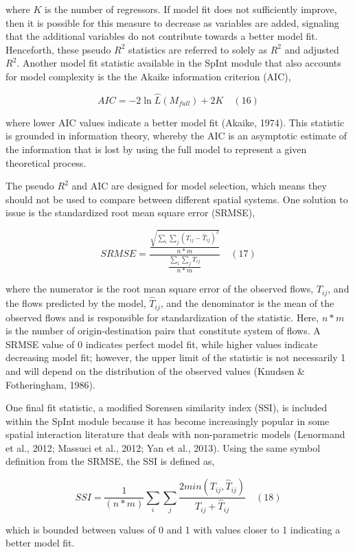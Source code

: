 \documentclass[11pt]{article}
\begin{document}
where \(K\) is the number of regressors. If model fit does not
sufficiently improve, then it is possible for this measure to decrease
as variables are added, signaling that the additional variables do not
contribute towards a better model fit. Henceforth, these pseudo \(R^2\)
statistics are referred to solely as \(R^2\) and adjusted \(R^2\).
Another model fit statistic available in the SpInt module that also
accounts for model complexity is the the Akaike information criterion
(AIC),

\[ AIC = -2\ln \hat{L}(M_{full}) + 2K  \quad(16)\]

where lower AIC values indicate a better model fit (Akaike, 1974). This
statistic is grounded in information theory, whereby the AIC is an
asymptotic estimate of the information that is lost by using the full
model to represent a given theoretical process.

The pseudo \(R^2\) and AIC are designed for model selection, which means
they should not be used to compare between different spatial systems.
One solution to issue is the standardized root mean square error
(SRMSE),

\[ SRMSE = \frac{\frac{\sqrt{\sum_{i}\sum_{j}(T_{ij} - \hat{T}_{ij})^{2}}}{n*m}}{\frac{\sum_{i}\sum_{j}T_{ij}}{n*m}} \quad(17)\]

where the numerator is the root mean square error of the observed
flows, \(T_{ij}\), and the flows predicted by the model,
\(\hat{T}_{ij}\), and the denominator is the mean of the observed flows
and is responsible for standardization of the statistic. Here, \(n*m\)
is the number of origin-destination pairs that constitute system of
flows. A SRMSE value of 0 indicates perfect model fit, while higher
values indicate decreasing model fit; however, the upper limit of the
statistic is not necessarily 1 and will depend on the distribution of
the observed values (Knudsen \& Fotheringham, 1986).

One final fit statistic, a modified Sorensen similarity index (SSI), is
included within the SpInt module because it has become increasingly
popular in some spatial interaction literature that deals with
non-parametric models (Lenormand et al., 2012; Massuci et al., 2012; Yan
et al., 2013). Using the same symbol definition from the SRMSE, the SSI
is defined as,

\[ SSI = \frac{1}{(n*m)} \sum_{i} \sum_{j} \frac{2min(T_{ij}, \hat{T}_{ij})}{T_{ij} + \hat{T}_{ij}} \quad(18)\]

which is bounded between values of 0 and 1 with values closer to 1
indicating a better model fit.
\end{document}
